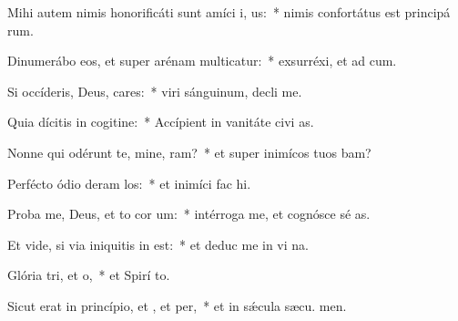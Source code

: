 \item Mihi autem nimis honorificáti sunt amíci i, us:~* nimis confortátus est principá rum.
\item Dinumerábo eos, et super arénam multicatur:~* exsurréxi, et ad  cum.
\item Si occíderis, Deus, cares:~* viri sánguinum, decli  me.
\item Quia dícitis in cogitine:~* Accípient in vanitáte civi as.
\item Nonne qui odérunt te, mine, ram?~* et super inimícos tuos bam?
\item Perfécto ódio deram los:~* et inimíci fac  hi.
\item Proba me, Deus, et to cor um:~* intérroga me, et cognósce sé as.
\item Et vide, si via iniquitis in  est:~* et deduc me in vi na.
\item Glória tri, et o,~* et Spirí to.
\item Sicut erat in princípio, et , et per,~* et in sǽcula sæcu. men.
